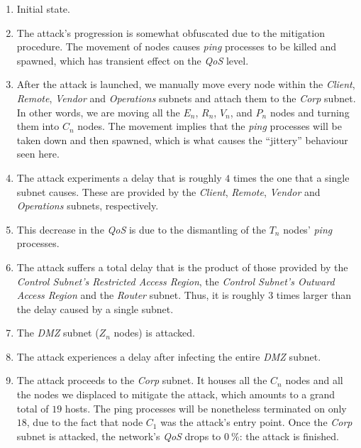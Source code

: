             \begin{enumerate}
                \item Initial state.
                \item The attack's progression is somewhat obfuscated due to the mitigation procedure. The movement of nodes causes \textit{ping} processes to be killed and spawned, which has transient effect on the \textit{QoS} level.
                \item After the attack is launched, we manually move every node within the \textit{Client}, \textit{Remote}, \textit{Vendor} and \textit{Operations} subnets and attach them to the \textit{Corp} subnet. In other words, we are moving all the $E_n$, $R_n$, $V_n$, and $P_n$ nodes and turning them into $C_n$ nodes. The movement implies that the \textit{ping} processes will be taken down and then spawned, which is what causes the ``jittery'' behaviour seen here.
                \item The attack experiments a delay that is roughly $4$ times the one that a single subnet causes. These are provided by the \textit{Client}, \textit{Remote}, \textit{Vendor} and \textit{Operations} subnets, respectively.
                \item This decrease in the \textit{QoS} is due to the dismantling of the $T_n$ nodes' \textit{ping} processes.
                \item The attack suffers a total delay that is the product of those provided by the \textit{Control Subnet's Restricted Access Region}, the \textit{Control Subnet's Outward Access Region} and the \textit{Router} subnet. Thus, it is roughly $3$ times larger than the delay caused by a single subnet.
                \item The \textit{DMZ} subnet ($Z_n$ nodes) is attacked.
                \item The attack experiences a delay after infecting the entire \textit{DMZ} subnet.
                \item The attack proceeds to the \textit{Corp} subnet. It houses all the $C_n$ nodes and all the nodes we displaced to mitigate the attack, which amounts to a grand total of $19$ hosts. The ping processes will be nonetheless terminated on only $18$, due to the fact that node $C_1$ was the attack's entry point. Once the \textit{Corp} subnet is attacked, the network's \textit{QoS} drops to $0\ \%$: the attack is finished.
            \end{enumerate}



